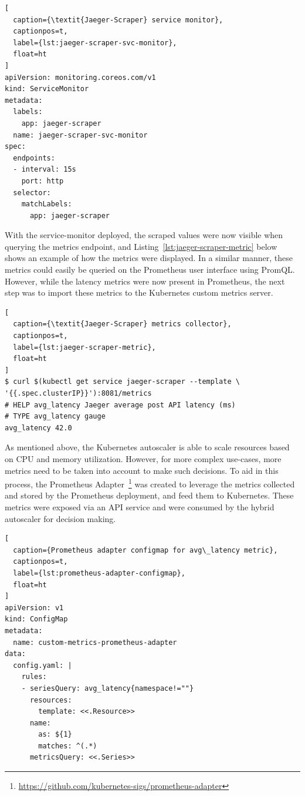 \begin{lstlisting}[
  caption={\textit{Jaeger-Scraper} service monitor},
  captionpos=t,
  label={lst:jaeger-scraper-svc-monitor},
  float=ht
]
apiVersion: monitoring.coreos.com/v1
kind: ServiceMonitor
metadata:
  labels:
    app: jaeger-scraper
  name: jaeger-scraper-svc-monitor
spec:
  endpoints:
  - interval: 15s
    port: http
  selector:
    matchLabels:
      app: jaeger-scraper
\end{lstlisting}

With the service-monitor deployed, the scraped values were now visible when querying the metrics endpoint, and Listing~\ref{lst:jaeger-scraper-metric} below shows an example of how the metrics were displayed. In a similar manner, these metrics could easily be queried on the Prometheus user interface using PromQL. However, while the latency metrics were now present in Prometheus, the next step was to import these metrics to the Kubernetes custom metrics server.\par

\begin{lstlisting}[
  caption={\textit{Jaeger-Scraper} metrics collector},
  captionpos=t,
  label={lst:jaeger-scraper-metric},
  float=ht
]
$ curl $(kubectl get service jaeger-scraper --template \
'{{.spec.clusterIP}}'):8081/metrics
# HELP avg_latency Jaeger average post API latency (ms)
# TYPE avg_latency gauge
avg_latency 42.0
\end{lstlisting}

As mentioned above, the Kubernetes autoscaler is able to scale resources based on CPU and memory utilization. However, for more complex use-cases, more metrics need to be taken into account to make such decisions. To aid in this process, the Prometheus Adapter~\footnote{\url{https://github.com/kubernetes-sigs/prometheus-adapter}} was created to leverage the metrics collected and stored by the Prometheus deployment, and feed them to Kubernetes. These metrics were exposed via an API service and were consumed by the hybrid autoscaler for decision making.\par

\begin{lstlisting}[
  caption={Prometheus adapter configmap for avg\_latency metric},
  captionpos=t,
  label={lst:prometheus-adapter-configmap},
  float=ht
]
apiVersion: v1
kind: ConfigMap
metadata:
  name: custom-metrics-prometheus-adapter
data:
  config.yaml: |
    rules:
    - seriesQuery: avg_latency{namespace!=""}
      resources:
        template: <<.Resource>>
      name:
        as: ${1}
        matches: ^(.*)
      metricsQuery: <<.Series>>
\end{lstlisting}

